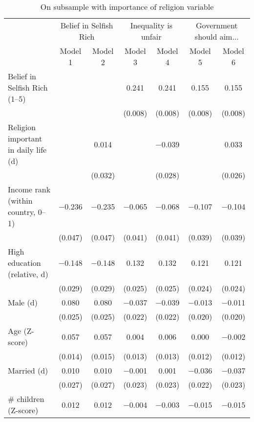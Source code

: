 \begin{table}

\caption{\label{tab:unnamed-chunk-77}On subsample with importance of religion variable}
\centering
\begin{tabular}[t]{lcccccc}
\toprule
\multicolumn{1}{c}{ } & \multicolumn{2}{c}{Belief in Selfish Rich} & \multicolumn{2}{c}{Inequality is unfair} & \multicolumn{2}{c}{Government should aim...} \\
\cmidrule(l{3pt}r{3pt}){2-3} \cmidrule(l{3pt}r{3pt}){4-5} \cmidrule(l{3pt}r{3pt}){6-7}
  & Model 1 & Model 2 & Model 3 & Model 4 & Model 5 & Model 6\\
\midrule
Belief in Selfish Rich (1--5) &  &  & \num{0.241} & \num{0.241} & \num{0.155} & \num{0.155}\\
 &  &  & (\num{0.008}) & (\num{0.008}) & (\num{0.008}) & (\num{0.008})\\
Religion important in daily life (d) &  & \num{0.014} &  & \num{-0.039} &  & \num{0.033}\\
 &  & (\num{0.032}) &  & (\num{0.028}) &  & (\num{0.026})\\
Income rank (within country, 0--1) & \num{-0.236} & \num{-0.235} & \num{-0.065} & \num{-0.068} & \num{-0.107} & \num{-0.104}\\
 & (\num{0.047}) & (\num{0.047}) & (\num{0.041}) & (\num{0.041}) & (\num{0.039}) & (\num{0.039})\\
High education (relative, d) & \num{-0.148} & \num{-0.148} & \num{0.132} & \num{0.132} & \num{0.121} & \num{0.121}\\
 & (\num{0.029}) & (\num{0.029}) & (\num{0.025}) & (\num{0.025}) & (\num{0.024}) & (\num{0.024})\\
Male (d) & \num{0.080} & \num{0.080} & \num{-0.037} & \num{-0.039} & \num{-0.013} & \num{-0.011}\\
 & (\num{0.025}) & (\num{0.025}) & (\num{0.022}) & (\num{0.022}) & (\num{0.020}) & (\num{0.020})\\
Age (Z-score) & \num{0.057} & \num{0.057} & \num{0.004} & \num{0.006} & \num{0.000} & \num{-0.002}\\
 & (\num{0.014}) & (\num{0.015}) & (\num{0.013}) & (\num{0.013}) & (\num{0.012}) & (\num{0.012})\\
Married (d) & \num{0.010} & \num{0.010} & \num{-0.001} & \num{0.001} & \num{-0.036} & \num{-0.037}\\
 & (\num{0.027}) & (\num{0.027}) & (\num{0.023}) & (\num{0.023}) & (\num{0.022}) & (\num{0.023})\\
\# children (Z-score) & \num{0.012} & \num{0.012} & \num{-0.004} & \num{-0.003} & \num{-0.015} & \num{-0.015}\\

\end{tabular}
\end{table}
